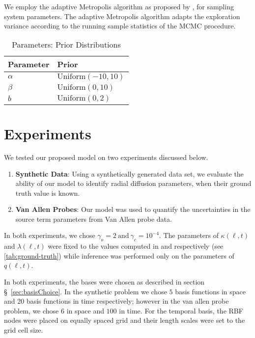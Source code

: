 We employ the adaptive Metropolis algorithm as proposed by \citet{haario2001}, for sampling
system parameters. The adaptive Metropolis algorithm adapts the exploration variance according to 
the running sample statistics of the MCMC procedure.

\begin{table}[ht]
  \caption{Parameters: Prior Distributions}
  \label{tab:prior}
  \centering
  \begin{tabular}{ll}
    \hline
    \textbf{Parameter} & \textbf{Prior}\\
    \hline
    $\alpha$ & $\text{Uniform}(-10, 10)$ \\
    $\beta$  & $\text{Uniform}(0, 10)$ \\ 
    $b$ & $\text{Uniform}(0, 2)$ \\
    \hline
  \end{tabular}
\end{table}


\section{Experiments}\label{sec:exp}

We tested our proposed model on two experiments discussed below.
%
\begin{enumerate}
  \item \textbf{Synthetic Data}: Using a synthetically generated data set, we evaluate the ability 
        of our model to identify radial diffusion parameters, when their ground truth value is 
        known.
  \item \textbf{Van Allen Probes}: Our model was used to quantify the uncertainties in the 
        source term parameters from Van Allen probe data. 
\end{enumerate}

In both experiments, we chose $\gamma_o = 2 \ \text{and} \ \gamma_c = 10^{-4}$. The parameters of 
$\kappa(\ell, t)$ and $\lambda(\ell, t)$ were fixed to the values computed in 
\citet{JGRA:JGRA15067} and \citet{GRL:GRL22815} respectively (see \cref{tab:ground-truth}) while 
inference was performed only on the parameters of $q(\ell, t)$. 

In both experiments, the bases were chosen as described in section \S~\ref{sec:basisChoice}. In the 
synthetic problem we chose $5$ basis functions in space and $20$ basis functions in time 
respectively; however in the van allen probe problem, we chose $6$ in space and $100$ in time. 
For the temporal basis, the RBF nodes were placed on equally spaced grid and their length scales 
were set to the grid cell size. 

